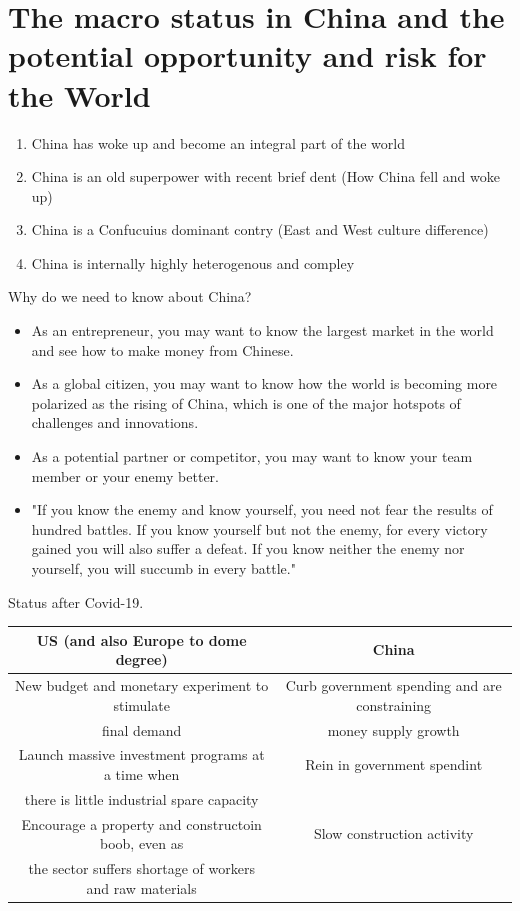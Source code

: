 \section{The macro status in China and the potential opportunity and risk for the World}

\begin{enumerate}[1.]
    \item China has woke up and become an integral part of the world
    \item China is an old superpower with recent brief dent (How China
        fell and woke up)
    \item China is a Confucuius dominant contry (East and West culture
        difference)
    \item China is internally highly heterogenous and compley
\end{enumerate}

Why do we need to know about China?

\begin{itemize}
    \item As an entrepreneur, you may want to know the largest market in
        the world and see how to make money from Chinese.
    \item As a global citizen, you may want to know how the world is becoming
        more polarized as the rising of China, which is one of the major
        hotspots of challenges and innovations.
    \item As a potential partner or competitor, you may want to know your
        team member or your enemy better.
    \item "If you know the enemy and know yourself, you need not fear the
        results of hundred battles. If you know yourself but not the enemy,
        for every victory gained you will also suffer a defeat. If you know
        neither the enemy nor yourself, you will succumb in every battle."
\end{itemize}

Status after Covid-19.

\begin{table}[h]
    \centering
    \begin{tabular}{|c|c|}
        \hline
        US (and also Europe to dome degree) & China \\ \hline
        New budget and monetary experiment to stimulate &
        Curb government spending and are constraining \\
        final demand & money supply growth \\ \hline
        Launch massive investment programs at a time when &
        Rein in government spendint \\
        there is little industrial spare capacity & \\ \hline
        Encourage a property and constructoin boob, even as &
        Slow construction activity \\
        the sector suffers shortage of workers and raw materials & \\ \hline
    \end{tabular}
\end{table}

